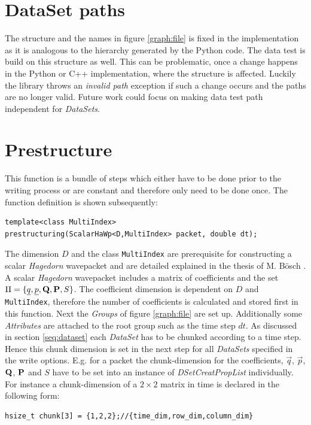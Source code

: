 \section{DataSet paths}
The structure and the names in figure \ref{graph:file} is fixed in the implementation as it is analogous to the hierarchy generated by the Python code. The data test is build on this structure as well. This can be problematic, once a change happens in the Python or C++ implementation, where the structure is affected. Luckily the library throws an \emph{invalid path} exception if such a change occurs and the paths are no longer valid. Future work could focus on making data test path independent for \textit{DataSets}.

\section{Prestructure}
\label{seq:prestructure}
This function is a bundle of steps which either have to be done prior to the writing process or are constant and therefore only need to be done once. The function definition is shown subsequently:
\begin{lstlisting}
template<class MultiIndex>
prestructuring(ScalarHaWp<D,MultiIndex> packet, double dt);
\end{lstlisting}
The dimension $D$ and the class \texttt{MultiIndex} are prerequisite for constructing a scalar \textit{Hagedorn} wavepacket and are detailed explained in the thesis of M. B\"osch \cite{bt_michajab}. A scalar \textit{Hagedorn} wavepacket includes a matrix of coefficients and the set $\Pi=\{ \underline{q},\underline{p},\mathbf{Q}, \mathbf{P},S\}$. The coefficient dimension is dependent on $D$ and \texttt{MultiIndex}, therefore the number of coefficients is calculated and stored first in this function. Next the \textit{Groups} of figure \ref{graph:file} are set up. Additionally some \textit{Attributes} are attached to the root group such as the time step $dt$. As discussed in section \ref{seq:dataset} each \textit{DataSet} has to be chunked according to a time step. Hence this chunk dimension is set in the next step for all \textit{DataSets} specified in the write options. E.g. for a packet the chunk-dimension for the coefficients, $\vec{q}$, $\vec{p}$, $\mathbf{Q}$, $\mathbf{P}$ and $S$ have to be set into an instance of \textit{DSetCreatPropList} individually. 
For instance a chunk-dimension of a $2 \times 2$ matrix in time is declared in the following form:
\begin{lstlisting}
hsize_t chunk[3] = {1,2,2};//{time_dim,row_dim,column_dim}
\end{lstlisting}
